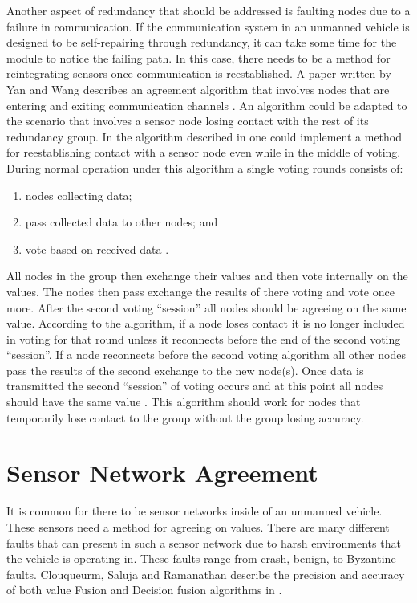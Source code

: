 \documentclass[twoside, conference]{IEEEtran}%
\begin{document}
Another aspect of redundancy that should be addressed is faulting nodes due to a failure in communication. If the communication system in an unmanned vehicle is designed to be self-repairing through redundancy, it can take some time for the module to notice the failing path. In this case, there needs to be a method for reintegrating sensors once communication is reestablished. A paper written by Yan and Wang describes an agreement algorithm that involves nodes that are entering and exiting communication channels \cite{Yan2007}. An algorithm could be adapted to the scenario that involves a sensor node losing contact with the rest of its redundancy group. In the algorithm described in \cite{Yan2007} one could implement a method for reestablishing contact with a sensor node even while in the middle of voting. During normal operation under this algorithm a single voting rounds consists of:
\begin{enumerate}
	\item nodes collecting data;
	\item pass collected data to other nodes; and
	\item vote based on received data \cite{Yan2007}.
\end{enumerate} 
All nodes in the group then exchange their values and then vote internally on the values. The nodes then pass exchange the results of there voting and vote once more. After the second voting ``session'' all nodes should be agreeing on the same value. According to the algorithm, if a node loses contact it is no longer included in voting for that round unless it reconnects before the end of the second voting ``session''. If a node reconnects before the second voting algorithm all other nodes pass the results of the second exchange to the new node(s). Once data is transmitted the second ``session'' of voting occurs and at this point all nodes should have the same value \cite{Yan2007}. This algorithm should work for nodes that temporarily lose contact to the group without the group losing accuracy.

\section{Sensor Network Agreement}\label{sec:sensornet-agreement}
It is common for there to be sensor networks inside of an unmanned vehicle. These sensors need a method for agreeing on values. There are many different faults that can present in such a sensor network due to harsh environments that the vehicle is operating in. These faults range from crash, benign, to Byzantine faults. Clouqueurm, Saluja and Ramanathan describe the precision and accuracy of both value Fusion and Decision fusion algorithms in \cite{Clouqueur2004}. 
\end{document}

